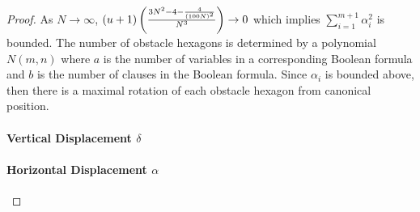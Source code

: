 \begin{proof}

As $N \rightarrow \infty$, $(u+1) \left( \frac{3N^2 - 4 - \frac{4}{(100N)^2}}{N^3} \right)\rightarrow 0$ which implies $\sum_{i = 1}^{m+1} \alpha_i^2$ is bounded.  
The number of obstacle hexagons is determined by a polynomial $N(m,n)$ where $a$ is the number of variables in a corresponding Boolean formula and $b$ is the number of clauses in the Boolean formula.
Since $\alpha_i$ is bounded above, then there is a maximal rotation of each obstacle hexagon from canonical position.


\paragraph{Vertical Displacement $\delta$}

\paragraph{Horizontal Displacement $\alpha$}
\end{proof}